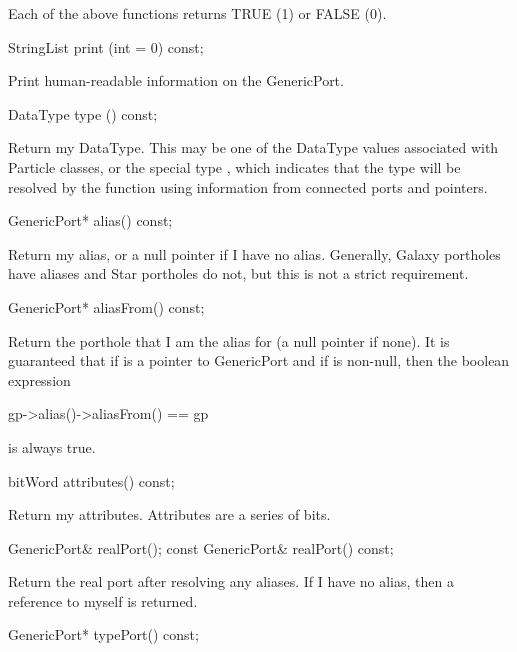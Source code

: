 Each of the above functions returns TRUE (1) or FALSE (0).

\begin{example}
StringList print (int  = 0) const;
\end{example}

Print human-readable information on the GenericPort.

\begin{example}
DataType type () const;
\end{example}

Return my DataType.  This may be one of the DataType values associated
with Particle classes, or the special type , which
indicates that the type will be resolved by the 
function using information from connected ports and  pointers.

\begin{example}
GenericPort* alias() const;
\end{example}

Return my alias, or a null pointer if I have no alias.  Generally,
Galaxy portholes have aliases and Star portholes do not, but this
is not a strict requirement.

\begin{example}
GenericPort* aliasFrom() const;
\end{example}

Return the porthole that I am the alias for (a null pointer if none).
It is guaranteed that if  is a pointer to GenericPort and if
 is non-null, then the boolean expression

\begin{example}
gp->alias()->aliasFrom() == gp
\end{example}

is always true.

\begin{example}
bitWord attributes() const;
\end{example}

Return my attributes.  Attributes are a series of bits.

\begin{example}
GenericPort& realPort();
const GenericPort& realPort() const;
\end{example}

Return the real port after resolving any aliases.  If I have no alias,
then a reference to myself is returned.

\begin{example}
GenericPort* typePort() const;
\end{example}

